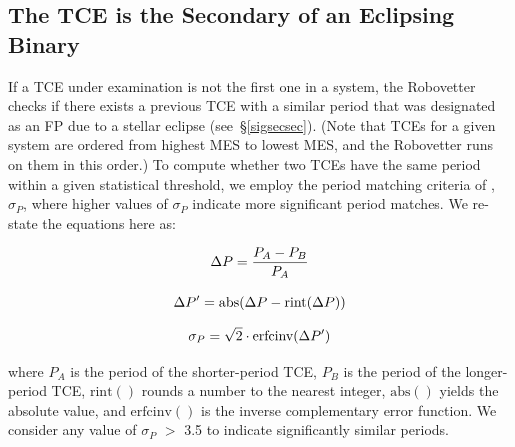 \subsection{The TCE is the Secondary of an Eclipsing Binary}
\label{s:issecond}
If a TCE under examination is not the first one in a system, the Robovetter checks if there exists a previous TCE with a similar period that was designated as an FP due to a stellar eclipse (see~\S\ref{sigsecsec}). (Note that TCEs for a given system are ordered from highest MES to lowest MES, and the Robovetter runs on them in this order.) To compute whether two TCEs have the same period within a given statistical threshold, we employ the period matching criteria of \citet[][see equations 1-3]{Coughlin2014a}, $\sigma_{P}$, where higher values of $\sigma_{P}$ indicate more significant period matches. We re-state the equations here as:

\begin{equation}
\label{peq1}
\Delta P = \frac{P_{A}-P_{B}}{P_{A}}\\
\end{equation}

\begin{equation}
\label{peq2}
\Delta P^{\prime} = \textrm{abs}(\Delta P - \textrm{rint}(\Delta P))\\
\end{equation}

\begin{equation}
\label{peq3}
\sigma_{P} = \sqrt{2}\cdot\textrm{erfcinv}(\Delta P^{\prime})\\
\end{equation}

\noindent where $P_{A}$ is the period of the shorter-period TCE, $P_{B}$ is the period of the longer-period TCE, $\mathrm{rint()}$ rounds a number to the nearest integer, $\mathrm{abs()}$ yields the absolute value, and $\mathrm{erfcinv()}$ is the inverse complementary error function. We consider any value of $\sigma_{P}$ $>$ 3.5 to indicate significantly similar periods.

